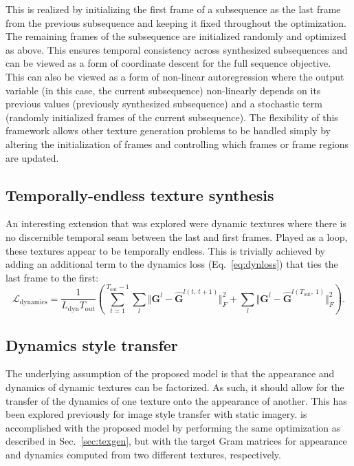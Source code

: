 This  is realized by initializing the first frame of a subsequence as the last 
frame from the previous subsequence and keeping it fixed throughout
the optimization.
The remaining frames of the subsequence are initialized randomly and
optimized as above.
This  ensures temporal consistency across synthesized subsequences
and can be viewed as a form of coordinate descent for the full
sequence objective.  This  can also be viewed as a form of non-linear autoregression where the output variable (in this case, the current subsequence) non-linearly depends on its previous values (previously synthesized subsequence) and a stochastic term (randomly initialized frames of the current subsequence).
The flexibility of this framework allows other texture generation
problems to be handled simply by altering the 
initialization of frames and controlling which
frames or frame regions are updated.



\subsection{Temporally-endless texture synthesis}\label{sec:temporally_endless_synthesis}

An interesting extension that was explored were dynamic textures where there is no discernible temporal seam between the last and first frames. Played as a loop, these textures appear to be temporally endless. This is trivially achieved by adding an additional term to the dynamics loss (Eq.\ \ref{eq:dynloss}) that ties the last frame to the first:
\begin{equation}
	\mathcal{L}_\text{dynamics} = \frac{1}{L_\text{dyn} T_\text{out}}\left(\sum_{t=1}^{T_\text{out}-1} \sum_{l}  \Vert \mathbf{G}^l - \hat{\mathbf{G}}^{l(t,\ t+1)}\Vert^2_F + \sum_{l}  \Vert \mathbf{G}^l - \hat{\mathbf{G}}^{l(T_\text{out},\ 1)}\Vert^2_F\right).
\end{equation}

\subsection{Dynamics style transfer}

The underlying assumption of the proposed model is that the appearance
and dynamics of dynamic textures can be factorized.
As such, it should allow for the transfer of the dynamics of
one texture onto the appearance of another.
This  has been explored previously for image style transfer
\cite{champandard2016,gatys2017} with static imagery.
 is accomplished with the proposed model by performing the same 
optimization as described in Sec.\ \ref{sec:texgen}, but with the target Gram matrices for 
appearance and dynamics computed from two different textures, respectively.

